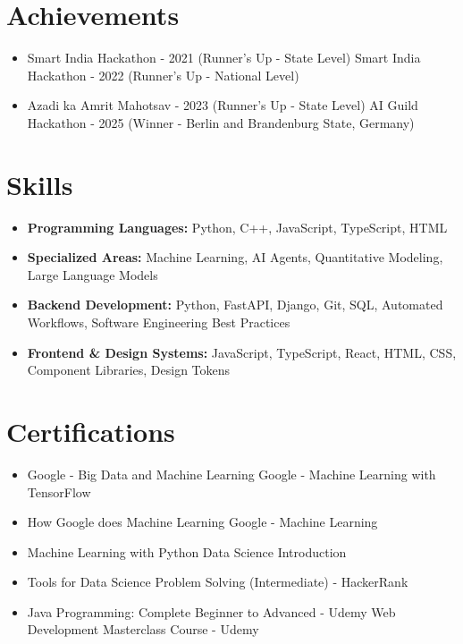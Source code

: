 \documentclass[a4paper,10pt]{article}
\begin{document}
\section*{Achievements}
\begin{itemize}
\item Smart India Hackathon - 2021 (Runner's Up - State Level) \hfill Smart India Hackathon - 2022 (Runner's Up - National Level)
\item Azadi ka Amrit Mahotsav - 2023 (Runner's Up - State Level) \hfill AI Guild Hackathon - 2025 (Winner - Berlin and Brandenburg State, Germany)
\end{itemize}

\section*{Skills}
\begin{itemize}
  \item \textbf{Programming Languages:} Python, C++, JavaScript, TypeScript, HTML
  \item \textbf{Specialized Areas:} Machine Learning, AI Agents, Quantitative Modeling, Large Language Models
  \item \textbf{Backend Development:} Python, FastAPI, Django, Git, SQL, Automated Workflows, Software Engineering Best Practices
  \item \textbf{Frontend \& Design Systems:} JavaScript, TypeScript, React, HTML, CSS, Component Libraries, Design Tokens
\end{itemize}

\section*{Certifications}
\begin{itemize}
\item Google - Big Data and Machine Learning \hfill Google - Machine Learning with TensorFlow
\item How Google does Machine Learning \hfill Google - Machine Learning
\item Machine Learning with Python \hfill Data Science Introduction
\item Tools for Data Science \hfill Problem Solving (Intermediate) - HackerRank
\item Java Programming: Complete Beginner to Advanced - Udemy \hfill Web Development Masterclass Course - Udemy
\end{itemize}
\end{document}
